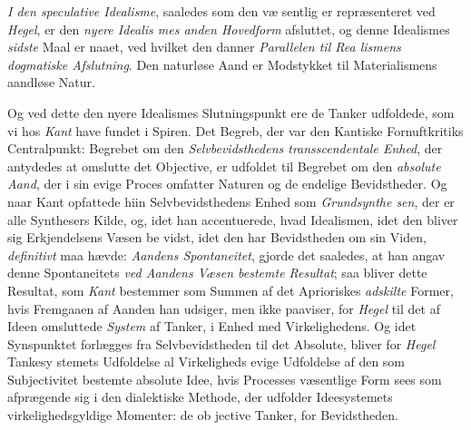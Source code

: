  \emph{I den speculative Idealisme}, saaledes som den væ\-%
sentlig er repræsenteret ved \emph{Hegel}, er den \emph{nyere Idealis\-%
mes anden Hovedform} afsluttet, og denne Idealismes \emph{sidste}
Maal er naaet, ved hvilket den danner \emph{Parallelen til Rea\-%
lismens dogmatiske Afslutning}. Den naturløse Aand
er Modstykket til Materialismens aandløse Natur.

Og ved dette den nyere Idealismes Slutningspunkt ere
de Tanker udfoldede, som vi hos \emph{Kant} have fundet i Spiren.
Det Begreb, der var den Kantiske Fornuftkritiks Centralpunkt:
Begrebet om den \emph{Selvbevidsthedens transscendentale
Enhed}, der antydedes at omslutte det Objective, er udfoldet
til Begrebet om den \emph{absolute Aand}, der i sin evige Proces
omfatter Naturen og de endelige Bevidstheder. Og naar Kant
opfattede hiin Selvbevidsthedens Enhed som \emph{Grundsynthe\-%
sen}, der er alle Synthesers Kilde, og, idet han accentuerede,
hvad Idealismen, idet den bliver sig Erkjendelsens Væsen be\-%
vidst, idet den har Bevidstheden om sin Viden, \emph{definitivt}
maa hævde: \emph{Aandens Spontaneitet}, gjorde det saaledes,
at han angav denne Spontaneitets \emph{ved Aandens Væsen
bestemte Resultat}; saa bliver dette Resultat, som \emph{Kant}
bestemmer som Summen af det Aprioriskes \emph{adskilte} Former,
hvis Fremgaaen af Aanden han udsiger, men ikke paaviser,
for \emph{Hegel} til det af Ideen omsluttede \emph{System} af Tanker, i
Enhed med Virkelighedens. Og idet Synspunktet forlægges fra
Selvbevidstheden til det Absolute, bliver for \emph{Hegel} Tankesy\-%
stemets Udfoldelse al Virkeligheds evige Udfoldelse af den som
Subjectivitet bestemte absolute Idee, hvis Processes væsentlige
Form sees som afprægende sig i den dialektiske Methode, der
udfolder Ideesystemets virkelighedsgyldige Momenter: de ob\-%
jective Tanker, for Bevidstheden.

